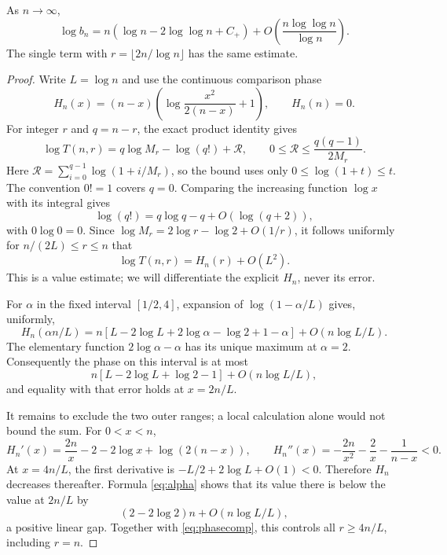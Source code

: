\begin{lemma}\label{lem:triangular}
As $n\to\infty$,
\begin{equation}\label{eq:blog}
 \log b_n=n(\log n-2\log\log n+C_+)
       +O\!\left(\frac{n\log\log n}{\log n}\right).
\end{equation}
The single term with $r=\lfloor2n/\log n\rfloor$ has the same estimate.
\end{lemma}
\begin{proof}
Write $L=\log n$ and use the continuous comparison phase
\[
 H_n(x)=(n-x)\left(\log\frac{x^2}{2(n-x)}+1\right),
 \qquad H_n(n)=0.
\]
For integer $r$ and $q=n-r$, the exact product identity gives
\begin{equation}\label{eq:product}
 \log T(n,r)=q\log M_r-\log(q!)+\mathcal R,
 \qquad 0\le\mathcal R\le\frac{q(q-1)}{2M_r}.
\end{equation}
Here $\mathcal R=\sum_{i=0}^{q-1}\log(1+i/M_r)$, so the bound uses only $0\le\log(1+t)\le t$. The convention $0!=1$ covers $q=0$. Comparing the increasing function $\log x$ with its integral gives
\[
 \log(q!)=q\log q-q+O(\log(q+2)),
\]
with $0\log0=0$. Since $\log M_r=2\log r-\log2+O(1/r)$, it follows uniformly for $n/(2L)\le r\le n$ that
\begin{equation}\label{eq:phasecomp}
 \log T(n,r)=H_n(r)+O(L^2).
\end{equation}
This is a value estimate; we will differentiate the explicit $H_n$, never its error.

For $\alpha$ in the fixed interval $[1/2,4]$, expansion of $\log(1-\alpha/L)$ gives, uniformly,
\begin{equation}\label{eq:alpha}
 H_n(\alpha n/L)
 =n\left[L-2\log L+2\log\alpha-\log2+1-\alpha\right]
     +O(n\log L/L).
\end{equation}
The elementary function $2\log\alpha-\alpha$ has its unique maximum at $\alpha=2$. Consequently the phase on this interval is at most
\[
 n[L-2\log L+\log2-1]+O(n\log L/L),
\]
and equality with that error holds at $x=2n/L$.

It remains to exclude the two outer ranges; a local calculation alone would not bound the sum. For $0<x<n$,
\[
 H_n'(x)=\frac{2n}{x}-2-2\log x+\log(2(n-x)),\qquad
 H_n''(x)=-\frac{2n}{x^2}-\frac2x-\frac1{n-x}<0.
\]
At $x=4n/L$, the first derivative is $-L/2+2\log L+O(1)<0$. Therefore $H_n$ decreases thereafter. Formula \eqref{eq:alpha} shows that its value there is below the value at $2n/L$ by
\[
 (2-2\log2)n+O(n\log L/L),
\]
a positive linear gap. Together with \eqref{eq:phasecomp}, this controls all $r\ge4n/L$, including $r=n$.


\end{proof}
